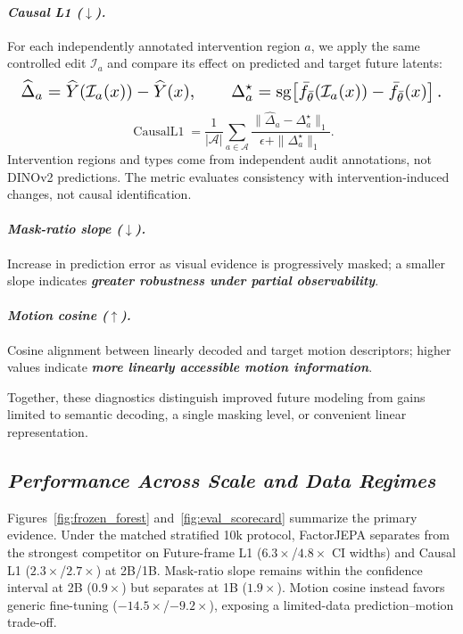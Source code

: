 \paragraph{\textbf{\emph{Causal L1 ($\downarrow$).}}}
For each independently annotated intervention region $a$, we apply the same
controlled edit $\mathcal I_a$ and compare its effect on predicted and target
future latents:
\begin{equation*}
\resizebox{0.98\columnwidth}{!}{$\displaystyle
\widehat\Delta_a
=
\widehat Y\!\left(\mathcal I_a(x)\right)-\widehat Y(x),
\qquad
\Delta_a^\star
=
\operatorname{sg}\!\left[
\bar f_{\bar\theta}\!\left(\mathcal I_a(x)\right)
-
\bar f_{\bar\theta}(x)
\right].
$}
\end{equation*}
\begin{equation*}
\operatorname{CausalL1}
=
\frac{1}{|\mathcal A|}
\sum_{a\in\mathcal A}
\frac{
\|\widehat\Delta_a-\Delta_a^\star\|_1
}{
\epsilon+\|\Delta_a^\star\|_1
}.
\end{equation*}
Intervention regions and types come from independent audit annotations, not
DINOv2 predictions. The metric evaluates consistency with
intervention-induced changes, not causal identification.

\paragraph{\textbf{\emph{Mask-ratio slope ($\downarrow$).}}}
Increase in prediction error as visual evidence is progressively masked; a
smaller slope indicates \textbf{\emph{greater robustness under partial
observability}}.

\paragraph{\textbf{\emph{Motion cosine ($\uparrow$).}}}
Cosine alignment between linearly decoded and target motion descriptors; higher
values indicate \textbf{\emph{more linearly accessible motion information}}.

Together, these diagnostics distinguish improved future modeling from gains
limited to semantic decoding, a single masking level, or convenient linear
representation.

\subsection{\textbf{\emph{Performance Across Scale and Data Regimes}}}

Figures~\ref{fig:frozen_forest} and~\ref{fig:eval_scorecard} summarize the
primary evidence. Under the matched stratified 10k protocol, FactorJEPA
separates from the strongest competitor on Future-frame L1
($6.3\times$/$4.8\times$ CI widths) and Causal L1
($2.3\times$/$2.7\times$) at 2B/1B. Mask-ratio slope remains within the
confidence interval at 2B ($0.9\times$) but separates at 1B
($1.9\times$). Motion cosine instead favors generic fine-tuning
($-14.5\times$/$-9.2\times$), exposing a limited-data
prediction--motion trade-off.

